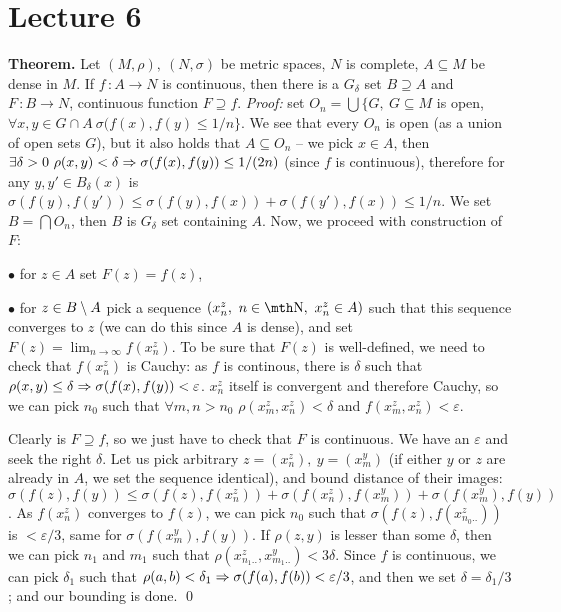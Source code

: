 \chapter{Lecture 6}


{\bf Theorem. } Let $(M,\rho),\ (N,\sigma)$ be metric spaces, $N$ is complete,
$A\subseteq M$ be dense in $M$. If $f\,:A\to N$ is continuous, then there is a 
$G_\delta$ set $B\supseteq A$ and $F\,:B\to N$, continuous function $F\supseteq 
f$.
\smallskip
{\it Proof:} set $O_n = \bigcup \{G,\ G\subseteq M$ is open, $\forall x,y\in 
G\cap A\ \sigma(f(x),f(y)\leq 1/n\}$. We see that every $O_n$ is open (as a 
union of open sets $G$), but it also holds that $A\subseteq O_n$ -- we pick 
$x\in A$, then $\exists \delta > 0\ \rho(x,y) < \delta \Rightarrow \sigma (f(x),
f(y)) \leq 1/(2n)$ (since $f$ is continuous), therefore for any $y,y' \in 
B_{\delta}(x)$ is $\sigma(f(y),f(y')) \leq \sigma(f(y),f(x)) + \sigma(f(y')
,f(x)) \leq 1/n$. We set $B=\bigcap O_n$, then $B$ is $G_\delta$ set containing 
$A$. Now, we proceed with construction of $F$:
{\parindent0.5in\parskip6pt
	\item{$\bullet$} for $z\in A$ set $F(z) = f(z)$,
	\item{$\bullet$} for $z\in B\setminus A$ pick a sequence $(x_n^z,\ n\in \N,\ 
		x_n^z\in A)$ such that this sequence converges to $z$ (we can do this 
		since $A$ is dense), and set $F(z) = \lim_{n\to \infty} f(x_n^z)$. To 
		be sure that $F(z)$ is well-defined, we need to check that $f(x_n^z)$
		is Cauchy: as $f$ is continous, there is $\delta$ such that $\rho(x,
		y)\leq \delta\Rightarrow \sigma(f(x),f(y)) < \varepsilon$. $x_n^z$ itself is convergent 
		and therefore Cauchy, so we can pick $n_0$ such that $\forall m,n>n_0$
		$\rho(x_m^z,x_n^z) < \delta$ and $f(x_m^z,x_n^z) < \varepsilon$.

}
Clearly is $F\supseteq f$, so we just have to check that $F$ is continuous.
We have an $\varepsilon$ and seek the right $\delta$. Let us pick arbitrary 
$z = (x_n^z),\ y=(x_m^y)$ (if either $y$ or $z$ are already in $A$, we set the 
sequence identical), and bound distance of their images: $\sigma(f(z),f(y)) 
\leq \sigma(f(z),f(x_n^z)) +\sigma(f(x_n^z),f(x_m^y)) +\sigma(f(x_m^y),f(y))$.
As $f(x_n^z)$ converges to $f(z)$, we can pick $n_0$ such that $\sigma(f(z),
f(x_{n_0..}^z))$ is $<\varepsilon/3$, same for $\sigma(f(x_m^y),f(y))$. If 
$\rho(z,y)$ is lesser than some $\delta$, then we can pick $n_1$ and $m_1$ 
such that $\rho(x_{n_1..}^z,x_{m_1..}^y) < 3\delta$. Since $f$ is continuous, 
we can pick $\delta_1$ such that $\rho(a,b) < \delta_1 \Rightarrow \sigma(f(a),f(b))
< \varepsilon/3$, and then we set $\delta = \delta_1/3$; and our bounding is 
done.
\qed

